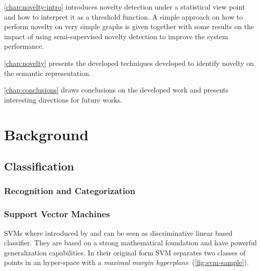 \autoref{chap:novelty-intro} introduces novelty detection under a
statistical view point and how to interpret it as a threshold function.
A simple approach on how to perform novelty on very simple graphs
is given together with some results on the impact of using semi-supervised
novelty detection to improve the system performance.

\autoref{chap:novelty} presents the developed techniques developed to identify
novelty on the semantic representation.

\autoref{chap:conclusions} draws conclusions on the developed work and presents
interesting directions for future works.



\chapter{Background}\label{chap:background}
%
%
%

\section{Classification}
\subsection{Recognition and Categorization}
\subsection{Support Vector Machines}
\Glspl{SVM} where introduced by \cite{cortes1995support} and can be seen as
discriminative linear based classifier. They are based on a strong mathematical
foundation and have powerful generalization capabilities. In their original form
\gls{SVM} separates two classes of points in an hyper-space with a
\emph{maximal margin hyperplane}~(\autoref{fig:svm-sample}).

